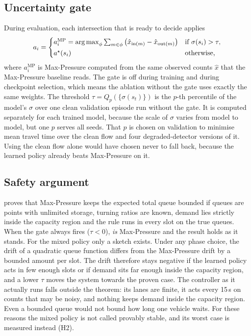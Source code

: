 \subsection{Uncertainty gate}
During evaluation, each intersection that is ready to decide applies
\begin{equation}
a_i=\begin{cases}
a_i^{\mathrm{MP}}=\operatorname*{arg\,max}_{\phi}\sum_{m\in\phi}\big(\hat x_{\mathrm{in}(m)}-\hat x_{\mathrm{out}(m)}\big)
& \text{if }\sigma(s_i)>\tau,\\[2pt]
a^\star(s_i) & \text{otherwise,}
\end{cases}
\label{eq:gate}
\end{equation}
where $a_i^{\mathrm{MP}}$ is Max-Pressure computed from the same observed counts $\hat x$ that
the Max-Pressure baseline reads. The gate is off during training and during checkpoint
selection, which means the ablation without the gate uses exactly the same weights. The
threshold $\tau=Q_p(\{\sigma(s_t)\})$ is the $p$-th percentile of the model's $\sigma$ over one
clean validation episode run without the gate. It is computed separately for each trained
model, because the scale of $\sigma$ varies from model to model, but one $p$ serves all seeds.
That $p$ is chosen on validation to minimise mean travel time over the clean flow and four
degraded-detector versions of it. Using the clean flow alone would have chosen never to fall
back, because the learned policy already beats Max-Pressure on it.

\subsection{Safety argument}
\label{sec:safety}
\citet{varaiya2013max} proves that Max-Pressure keeps the expected total queue bounded if
queues are points with unlimited storage, turning ratios are known, demand lies strictly inside
the capacity region and the rule runs in every slot on the true queues. When the gate always
fires ($\tau<0$), \ugmarl{} \emph{is} Max-Pressure and the result holds as it stands. For the
mixed policy only a sketch exists. Under any phase choice, the drift of a quadratic queue
function differs from the Max-Pressure drift by a bounded amount per slot. The drift therefore
stays negative if the learned policy acts in few enough slots or if demand sits far enough
inside the capacity region, and a lower $\tau$ moves the system towards the proven case. The
controller as it actually runs falls outside the theorem: its lanes are finite, it acts every
15\,s on counts that may be noisy, and nothing keeps demand inside the capacity region. Even a
bounded queue would not bound how long one vehicle waits. For these reasons the mixed policy
is not called provably stable, and its worst case is measured instead (H2).

